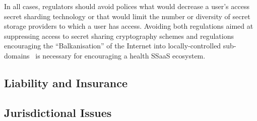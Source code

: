 In all cases, regulators should avoid polices what would decrease a
user's access secret sharding technology or that would limit the
number or diversity of secret storage providers to which a user has
access. Avoiding both regulations aimed at suppressing access to
secret sharing cryptography schemes and regulations encouraging the
``Balkanisation'' of the Internet into locally-controlled
sub-domains~\cite{lee2014} is necessary for encouraging a health SSaaS
ecosystem.

\subsection{Liability and Insurance}

\subsection{Jurisdictional Issues}
\label{chap:policy:trust:jurisdiction}

